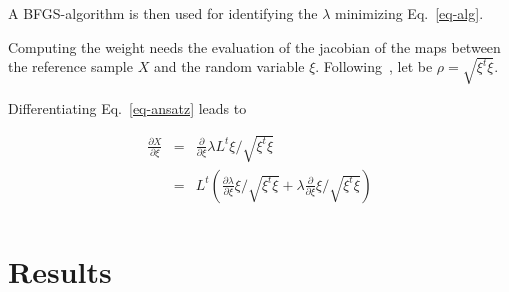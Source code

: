 \documentclass[10pt,openany,onecolumn,a4wide,pof]{article}
\newcommand{\mypar}[1]{\left(#1\right)}
\newcommand{\rpoint}{X}
\begin{document}
A BFGS-algorithm is then used for identifying the $\lambda$ minimizing Eq.~\eqref{eq-alg}.

Computing the weight needs the evaluation of the jacobian of the maps between the reference sample $\rpoint$ and the random variable $\xi$.
Following~\cite{Morzfeld2012}, let be $\rho = \sqrt{\xi^t \xi}$.

Differentiating Eq.~\eqref{eq-ansatz} leads to

\begin{equation}
\begin{array}{lll}
\frac{\partial \rpoint}{\partial \xi} &=& \frac{\partial}{\partial \xi} \lambda L^t \xi/\sqrt{\xi^t \xi}\\
 &=& L^t \mypar{\frac{\partial\lambda}{\partial \xi} \xi/\sqrt{\xi^t \xi} + \lambda \frac{\partial}{\partial \xi} \xi/\sqrt{\xi^t \xi} }\\
\end{array}
\end{equation}



%
\section{Results}
\label{sec-results}
\end{document}
